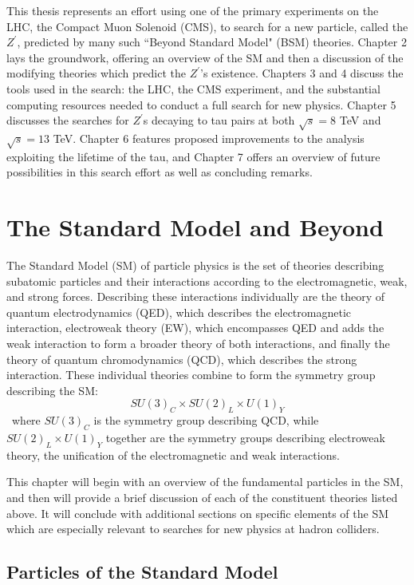 This thesis represents an effort using one of the primary experiments on the LHC, the Compact Muon Solenoid (CMS), to search for a new particle, called the \emph{$Z^\prime$}, predicted by many such ``Beyond Standard Model" (BSM) theories. Chapter 2 lays the groundwork, offering an overview of the SM and then a discussion of the modifying theories which predict the $Z^\prime$'s existence. Chapters 3 and 4 discuss the tools used in the search: the LHC, the CMS experiment, and the substantial computing resources needed to conduct a full search for new physics. Chapter 5 discusses the searches for $Z^\prime$s decaying to tau pairs at both $\sqrt{s} = 8$ TeV and $\sqrt{s} = 13$ TeV. Chapter 6 features proposed improvements to the analysis exploiting the lifetime of the tau, and Chapter 7 offers an overview of future possibilities in this search effort as well as concluding remarks.
\clearpage

\chapter{The Standard Model and Beyond}


The Standard Model (SM) of particle physics is the set of theories describing subatomic particles and their interactions according to the electromagnetic, weak, and strong forces. Describing these interactions individually are the theory of quantum electrodynamics (QED), which describes the electromagnetic interaction, electroweak theory (EW), which encompasses QED and adds the weak interaction to form a broader theory of both interactions, and finally the theory of quantum chromodynamics (QCD), which describes the strong interaction. These individual theories combine to form the symmetry group describing the SM:
\begin{equation}
SU(3)_{C} \times SU(2)_{L} \times U(1)_{Y}
\end{equation}
\noindent\ where $SU(3)_{C}$ is the symmetry group describing QCD, while $SU(2)_{L} \times U(1)_{Y}$ together are the symmetry groups describing electroweak theory, the unification of the electromagnetic and weak interactions.

This chapter will begin with an overview of the fundamental particles in the SM, and then will provide a brief discussion of each of the constituent theories listed above. It will conclude with additional sections on specific elements of the SM which are especially relevant to searches for new physics at hadron colliders.

\section{Particles of the Standard Model}


